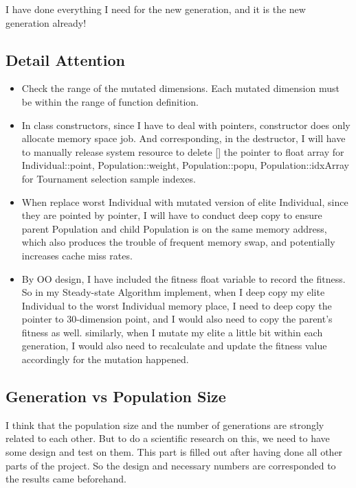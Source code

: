 \documentclass[10pt,b5paper]{article}
\begin{document}
I have done everything I need for the new generation, and it is the new generation already!
\subsection{Detail Attention}
\label{sec-2-11}
\begin{itemize}
\item Check the range of the mutated dimensions. Each mutated dimension must be within the range of function definition.
\item In class constructors, since I have to deal with pointers, constructor does only allocate memory space job. And corresponding, in the destructor, I will have to manually release system resource to delete [] the pointer to float array for Individual::point, Population::weight, Population::popu, Population::idxArray for Tournament selection sample indexes.
\item When replace worst Individual with mutated version of elite Individual, since they are pointed by pointer, I will have to conduct deep copy to ensure parent Population and child Population is on the same memory address, which also produces the trouble of frequent memory swap, and potentially increases cache miss rates.
\item By OO design, I have included the fitness float variable to record the fitness. So in my Steady-state Algorithm implement, when I deep copy my elite Individual to the worst Individual memory place, I need to deep copy the pointer to 30-dimension point, and I would also need to copy the parent's fitness as well. similarly, when I mutate my elite a little bit within each generation, I would also need to recalculate and update the fitness value accordingly for the mutation happened.
\end{itemize}
\subsection{Generation vs Population Size}
\label{sec-2-12}
I think that the population size and the number of generations are strongly related to each other. But to do a scientific research on this, we need to have some design and test on them. This part is filled out after having done all other parts of the project. So the design and necessary numbers are corresponded to the results came beforehand.
\end{document}
